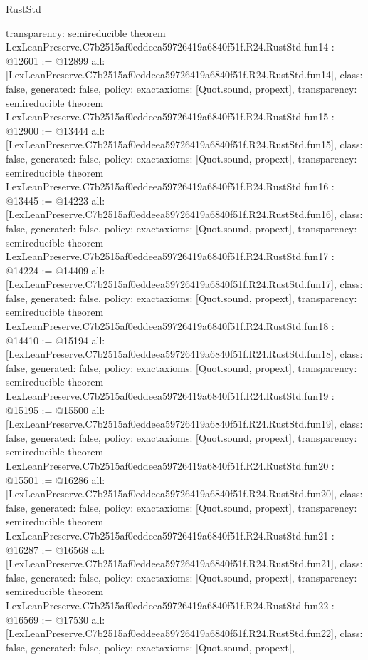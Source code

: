 \begin{lexlean}{RustStd}
\begin{coremodule}
{  transparency: semireducible
}
theorem LexLeanPreserve.C7b2515af0eddeea59726419a6840f51f.R24.RustStd.fun14 : @12601 := @12899 {
  all: [LexLeanPreserve.C7b2515af0eddeea59726419a6840f51f.R24.RustStd.fun14],
  class: false,
  generated: false,
  policy: exact{axioms: [Quot.sound, propext]},
  transparency: semireducible
}
theorem LexLeanPreserve.C7b2515af0eddeea59726419a6840f51f.R24.RustStd.fun15 : @12900 := @13444 {
  all: [LexLeanPreserve.C7b2515af0eddeea59726419a6840f51f.R24.RustStd.fun15],
  class: false,
  generated: false,
  policy: exact{axioms: [Quot.sound, propext]},
  transparency: semireducible
}
theorem LexLeanPreserve.C7b2515af0eddeea59726419a6840f51f.R24.RustStd.fun16 : @13445 := @14223 {
  all: [LexLeanPreserve.C7b2515af0eddeea59726419a6840f51f.R24.RustStd.fun16],
  class: false,
  generated: false,
  policy: exact{axioms: [Quot.sound, propext]},
  transparency: semireducible
}
theorem LexLeanPreserve.C7b2515af0eddeea59726419a6840f51f.R24.RustStd.fun17 : @14224 := @14409 {
  all: [LexLeanPreserve.C7b2515af0eddeea59726419a6840f51f.R24.RustStd.fun17],
  class: false,
  generated: false,
  policy: exact{axioms: [Quot.sound, propext]},
  transparency: semireducible
}
theorem LexLeanPreserve.C7b2515af0eddeea59726419a6840f51f.R24.RustStd.fun18 : @14410 := @15194 {
  all: [LexLeanPreserve.C7b2515af0eddeea59726419a6840f51f.R24.RustStd.fun18],
  class: false,
  generated: false,
  policy: exact{axioms: [Quot.sound, propext]},
  transparency: semireducible
}
theorem LexLeanPreserve.C7b2515af0eddeea59726419a6840f51f.R24.RustStd.fun19 : @15195 := @15500 {
  all: [LexLeanPreserve.C7b2515af0eddeea59726419a6840f51f.R24.RustStd.fun19],
  class: false,
  generated: false,
  policy: exact{axioms: [Quot.sound, propext]},
  transparency: semireducible
}
theorem LexLeanPreserve.C7b2515af0eddeea59726419a6840f51f.R24.RustStd.fun20 : @15501 := @16286 {
  all: [LexLeanPreserve.C7b2515af0eddeea59726419a6840f51f.R24.RustStd.fun20],
  class: false,
  generated: false,
  policy: exact{axioms: [Quot.sound, propext]},
  transparency: semireducible
}
theorem LexLeanPreserve.C7b2515af0eddeea59726419a6840f51f.R24.RustStd.fun21 : @16287 := @16568 {
  all: [LexLeanPreserve.C7b2515af0eddeea59726419a6840f51f.R24.RustStd.fun21],
  class: false,
  generated: false,
  policy: exact{axioms: [Quot.sound, propext]},
  transparency: semireducible
}
theorem LexLeanPreserve.C7b2515af0eddeea59726419a6840f51f.R24.RustStd.fun22 : @16569 := @17530 {
  all: [LexLeanPreserve.C7b2515af0eddeea59726419a6840f51f.R24.RustStd.fun22],
  class: false,
  generated: false,
  policy: exact{axioms: [Quot.sound, propext]},
}
\end{coremodule}
\end{lexlean}
